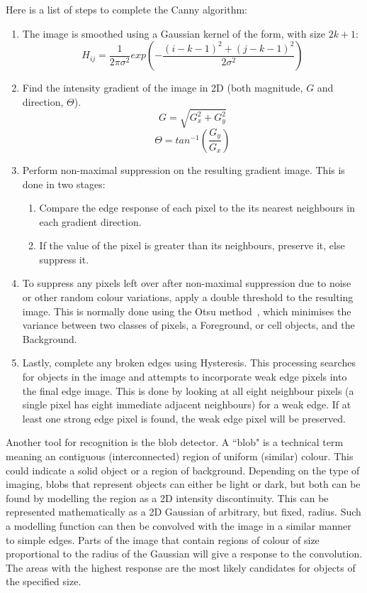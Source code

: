 Here is a list of steps to complete the Canny algorithm:
\begin{enumerate}
	\item The image is smoothed using a Gaussian kernel of the form, with size $2k + 1$:
	$$ H_{ij} = \frac{1}{2 \pi \sigma^2} exp \left( -\frac{(i - k - 1)^2 + (j - k - 1)^2}{2 \sigma^2} \right) $$
	\item Find the intensity gradient of the image in 2D (both magnitude, $G$ and direction, $\Theta$).
	$$ G = \sqrt{G^2_x + G^2_y} $$
	$$ \Theta = tan^{-1} (\frac{G_y}{G_x}) $$
	\item Perform non-maximal suppression on the resulting gradient image. This is done in two stages:
	\begin{enumerate}
		\item Compare the edge response of each pixel to the its nearest neighbours in each gradient direction.
		\item If the value of the pixel is greater than its neighbours, preserve it, else suppress it.
	\end{enumerate}
	\item To suppress any pixels left over after non-maximal suppression due to noise or other random colour variations, apply a double threshold to the resulting image. This is normally done using the Otsu method~\cite{Liao:01}, which minimises the variance between two classes of pixels, a Foreground, or cell objects, and the Background.
	\item Lastly, complete any broken edges using Hysteresis. This processing searches for objects in the image and attempts to incorporate weak edge pixels into the final edge image. This is done by looking at all eight neighbour pixels (a single pixel has eight immediate adjacent neighbours) for a weak edge. If at least one strong edge pixel is found, the weak edge pixel will be preserved.
\end{enumerate}

Another tool for recognition is the blob detector. A ``blob" is a technical term meaning an contiguous (interconnected) region of uniform (similar) colour. This could indicate a solid object or a region of background. Depending on the type of imaging, blobs that represent objects can either be light or dark, but both can be found by modelling the region as a 2D intensity discontinuity. This can be represented mathematically as a 2D Gaussian of arbitrary, but fixed, radius. Such a modelling function can then be convolved with the image in a similar manner to simple edges. Parts of the image that contain regions of colour of size proportional to the radius of the Gaussian will give a response to the convolution. The areas with the highest response are the most likely candidates for objects of the specified size.

